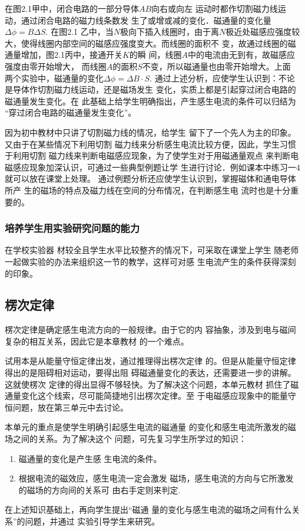 在图2.1甲中，闭合电路的一部分导体$AB$向右或向左
运动时都作切割磁力线运动，通过闭合电路的磁力线条数发
生了或增或减的变化．磁通量的变化量$\Delta\phi=B\Delta S$. 在图2.1
乙中，当$N$极向下插入线圈时，由于离$N$极近处磁感应强度较
大，使得线圈内部空间的磁感应强度变大。而线圈的面积不
变，故通过线圈的磁通量增加，图2.1丙中，接通开关$K$的瞬
间，线圈$A$中的电流由无到有，故磁感应强度由零开始增大，
而线圈$A$的面积$S$不变，所以磁通量也由零开始增大。上面
两个实验中，磁通量的变化$\Delta\phi=\Delta B\cdot S$. 通过上述分析，应使学生认识到：不论是导体作切割磁力线运动，还是磁场发生
变化，实质上都是引起穿过闭合电路的磁通量发生变化。在
此基础上给学生明确指出，产生感生电流的条件可以归结为
“穿过闭合电路的磁通量发生变化”。

因为初中教材中只讲了切割磁力线的情况，给学生
留下了一个先人为主的印象。又由于在某些情况下利用切割
磁力线来分析感生电流比较方便，因此，学生习惯于利用切割
磁力线来判断电磁感应现象，为了使学生对于用磁通量观点
来判断电磁感应现象加深认识，可通过一些典型例题让学
生进行讨论．例如课本中练习一4就可以放在课堂上处理。
通过例题分析还应使学生认识到，掌握磁体和通电导体所产
生的磁场的特点及磁力线在空间的分布情况，在判断感生电
流时也是十分重要的。


\subsubsection{培养学生用实验研究问题的能力}

在学校实验器
材较全且学生水平比较整齐的情况下，可采取在课堂上学生
随老师一起做实验的办法来组织这一节的教学，这样可对感
生电流产生的条件获得深刻的印象。

\subsection{楞次定律}
楞次定律是确定感生电流方向的一般规律。由于它的内
容抽象，涉及到电与磁间复杂的相互关系，因此它是本章教材
的一个难点。

试用本是从能量守恒定律出发，通过推理得出楞次定律
的。但是从能量守恒定律得出的是阻碍相对运动，要得出阻
碍磁通量变化的表达，还需要进一步的讲解。这就使楞次
定律的得出显得不够轻快。为了解决这个问题，本单元教材
抓住了磁通量变化这个线索，尽可能简捷地引出楞次定律。至
于电磁感应现象中的能量守恒问题，放在第三单元中去讨论。

本单元的重点是使学生明确引起感生电流的磁通量
的变化和感生电流所激发的磁场之间的关系。为了解决这个
问题，可先复习学生所学过的知识：
\begin{enumerate}
\item 磁通量的变化是产生感
生电流的条件。  
  \item 根据电流的磁效应，感生电流一定会激发
磁场，感生电流的方向与它所激发的磁场的方向间的关系可
由右手定则来判定.
\end{enumerate}
在上述知识基础上，再向学生提出“磁通
量的变化与感生电流的磁场之间有什么关系”的问题，并通过
实验引导学生来研究。

